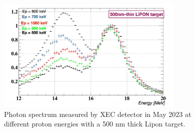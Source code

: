 \begin{refsection}
        \begin{figure}[]
            \centering
            \includegraphics[width = 0.8\textwidth]{Figures/X17/X17_XEC_2023.pdf}
            \caption[X17: XEC spectra at different proton energies]{Photon spectrum measured by XEC detector in May 2023 at different proton energies with a 500 nm thick Lipon target.}
            \label{fig:xecspectrum}
        \end{figure}


\end{refsection}

